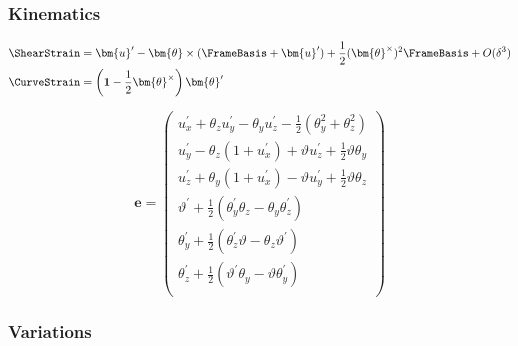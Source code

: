 \subsubsection{Kinematics}

\begin{equation}
\begin{aligned}
\ShearStrain &= \bm{u}^{\prime} - \bm{\theta}\times(\FrameBasis  + \bm{u}^{\prime})+ \frac{1}{2}(\bm{\theta}^{\times})^{2}\FrameBasis 
 + O(\delta^3)\\
\CurveStrain &= 
\left(\mathbf{1} - \frac{1}{2}\bm{\theta}^\times\right)\bm{\theta}^{\prime}
\end{aligned}
\label{eq:delta-shear-strain}
\end{equation}

\begin{equation*}
\bm{e} =
\begin{pmatrix}
u_{x}^{\prime}+\theta_z u_{y}^{\prime}-\theta_y u_{z}^{\prime}-\frac{1}{2}(\theta_y^2+\theta_z^2) \\
u_{y}^{\prime}-\theta_z\left(1+u_{x}^{\prime}\right)+\vartheta u_{z}^{\prime}+\frac{1}{2}\vartheta \theta_y \\
u_{z}^{\prime}+\theta_y\left(1+u_{x}^{\prime}\right)-\vartheta u_{y}^{\prime}+\frac{1}{2}\vartheta \theta_z \\
\vartheta^{\prime}+\frac{1}{2}\left(\theta_y^{\prime} \theta_z-\theta_y \theta_z^{\prime}\right) \\
\theta_y^{\prime}+\frac{1}{2}\left(\theta_z^{\prime} \vartheta-\theta_z \vartheta^{\prime}\right) \\
\theta_z^{\prime}+\frac{1}{2}\left(\vartheta^{\prime} \theta_y-\vartheta \theta_y^{\prime}\right) \\
\end{pmatrix}
\end{equation*}


\subsubsection{Variations}

